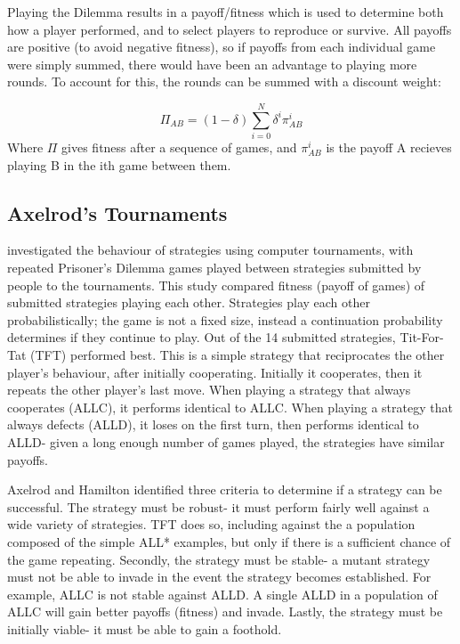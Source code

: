 \documentclass[a4paper,11pt,bcshonoursthesis,singlespace,twoside]{cssethesis}
\begin{document}
Playing the Dilemma results in a payoff/fitness which is used to determine both how a player performed, and to select players to reproduce or survive. All payoffs are positive (to avoid negative fitness), so if payoffs from each individual game were simply summed, there would have been an advantage to playing more rounds. To account for this, the rounds can be summed with a discount weight:

\begin{equation}
\Pi_{AB}=(1-\delta)\sum^{N}_{i=0}{\delta^i\pi^i_{AB}}
\end{equation}
Where $\Pi$ gives fitness after a sequence of games, and $\pi^i_{AB}$ is the payoff A recieves playing B in the ith game between them.

\subsection{Axelrod's Tournaments}
\citet{axelrod:Science:1981} investigated the behaviour of strategies using computer tournaments, with repeated Prisoner's Dilemma games played between strategies submitted by people to the tournaments. 
This study compared fitness (payoff of games) of submitted strategies playing each other. 
Strategies play each other probabilistically; the game is not a fixed size, instead a continuation probability determines if they continue to play. Out of the 14 submitted strategies, Tit-For-Tat (TFT) performed best. 
This is a simple strategy that reciprocates the other player's behaviour, after initially cooperating. 
Initially it cooperates, then it repeats the other player's last move. 
When playing a strategy that always cooperates (ALLC), it performs identical to ALLC. 
When playing a strategy that always defects (ALLD), it loses on the first turn, then performs identical to ALLD- given a long enough number of games played, the strategies have similar payoffs. 

Axelrod and Hamilton identified three criteria to determine if a strategy can be successful. The strategy must be robust- it must perform fairly well against a wide variety of strategies. TFT does so, including against the a population composed of the simple ALL* examples, but only if there is a sufficient chance of the game repeating. Secondly, the strategy must be stable- a mutant strategy must not be able to invade in the event the strategy becomes established. For example, ALLC is not stable against ALLD. 
A single ALLD in a population of ALLC will gain better payoffs (fitness) and invade. 
Lastly, the strategy must be initially viable- it must be able to gain a foothold. 
\end{document}
